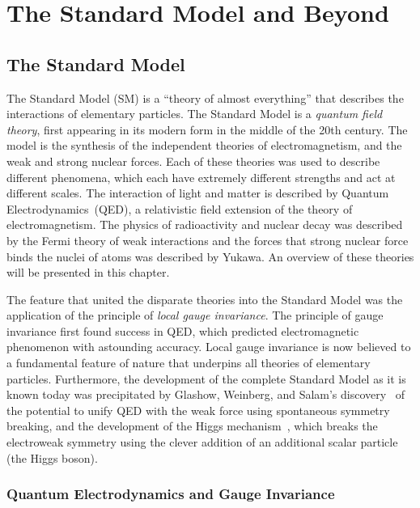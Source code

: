 \ifx\master\undefined\fi

\chapter{The Standard Model and Beyond}
\label{ch:theory}

\section{The Standard Model}

The Standard Model (SM) is a ``theory of almost everything'' that describes the
interactions of elementary particles.  The Standard Model is a \emph{quantum
field theory}, first appearing in its modern form in the middle of the 20th
century.  The model is the synthesis of the independent theories of
electromagnetism, and the weak and strong nuclear forces.  Each of these
theories was used to describe different phenomena, which each have extremely
different strengths and act at different scales.  The interaction of light and
matter is described by Quantum Electrodynamics~(QED), a relativistic field
extension of the theory of electromagnetism.  The physics of radioactivity and
nuclear decay was described by the Fermi theory of weak interactions and the
forces that strong nuclear force binds the nuclei of atoms was described by
Yukawa.  An overview of these theories will be presented in this chapter.  

The feature that united the disparate theories into the Standard Model was the
application of the principle of \emph{local gauge invariance}. The principle of
gauge invariance first found success in QED, which predicted electromagnetic
phenomenon with astounding accuracy.  Local gauge invariance is now believed to
a fundamental feature of nature that underpins all theories of elementary
particles.  Furthermore, the development of the complete Standard Model as it
is known today was precipitated by  Glashow, Weinberg, and Salam's
discovery~\cite{ref:GlashowSymmetryBreaking} of the potential to unify QED with
the weak force using spontaneous symmetry breaking, and the development of the
Higgs mechanism~\cite{ref:HiggsMechanism}, which breaks the electroweak symmetry
using the clever addition of an additional scalar particle (the Higgs boson).

\subsection{Quantum Electrodynamics and Gauge Invariance}

